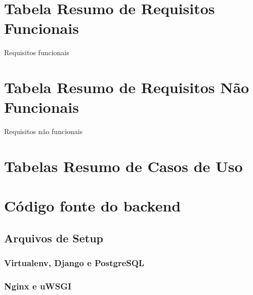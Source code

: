 \chapter{Tabela Resumo de Requisitos Funcionais}
   \begin{table}[H]
        \centering
        \caption{Requisitos funcionais}
        \label{tab:reqFunc}
        \PrintRequisitosFunc
    \end{table}

\chapter{Tabela Resumo de Requisitos Não Funcionais}
   \begin{table}[H]
        \centering
        \caption{Requisitos não funcionais}
        \label{tab:reqNFunc}
        \PrintRequisitosNFunc
    \end{table}
    
\chapter{Tabelas Resumo de Casos de Uso}


\chapter{Código fonte do backend}\label{anexo:sources}
\let\svaddcontentsline\addcontentsline
\renewcommand\addcontentsline[3]{%
  \ifthenelse{\equal{#1}{lol}}{}%
  {\svaddcontentsline{#1}{#2}{#3}}}
%
\section{Arquivos de Setup}
\subsection{Virtualenv, Django e PostgreSQL}

\clearpage
\subsection{Nginx e uWSGI}\label{anexo:nginx-uwsgi}




\clearpage
